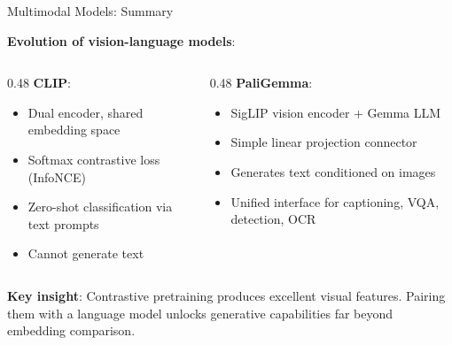 \begin{frame}{Multimodal Models: Summary}

  \textbf{Evolution of vision-language models}:

  \vspace{0.3em}
  \begin{center}
  \end{center}

  \vspace{0.5em}
  \begin{columns}
    \begin{column}{0.48\textwidth}
      \textbf{CLIP}:
      \begin{itemize}
        \item Dual encoder, shared embedding space
        \item Softmax contrastive loss (InfoNCE)
        \item Zero-shot classification via text prompts
        \item Cannot generate text
      \end{itemize}
    \end{column}
    \begin{column}{0.48\textwidth}
      \textbf{PaliGemma}:
      \begin{itemize}
        \item SigLIP vision encoder + Gemma LLM
        \item Simple linear projection connector
        \item Generates text conditioned on images
        \item Unified interface for captioning, VQA, detection, OCR
      \end{itemize}
    \end{column}
  \end{columns}

  \vspace{0.3em}
  \textbf{Key insight}: Contrastive pretraining produces excellent visual features. Pairing them with a language model unlocks generative capabilities far beyond embedding comparison.
\end{frame}
